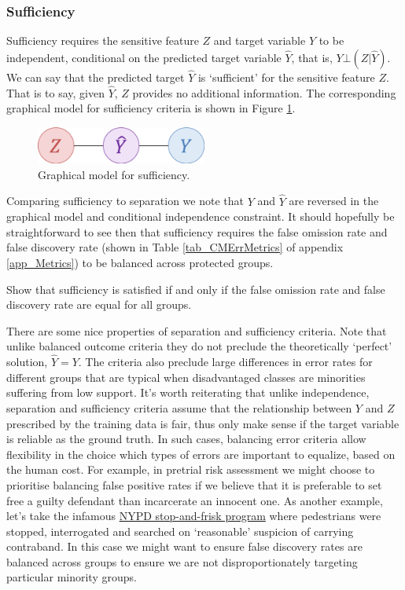 \subsubsection*{Sufficiency}

Sufficiency requires the sensitive feature $Z$ and target variable $Y$ to be independent, conditional on the predicted target variable $\hat{Y}$, that is, $Y \bot (Z|\hat{Y})$. We can say that the predicted target $\hat{Y}$ is `sufficient' for the sensitive feature $Z$. That is to say, given $\hat{Y}$, $Z$ provides no additional information. The corresponding graphical model for sufficiency criteria is shown in Figure \ref{fig_sufficiency}.
%
\begin{figure}[h!]
\centering
\includegraphics[width=0.5\textwidth]{03_GroupFairness/figures/Fig_sufficiency.png}
\caption{Graphical model for sufficiency.}
\label{fig_sufficiency}
\end{figure}
%
Comparing sufficiency to separation we note that $Y$ and $\hat{Y}$ are reversed in the graphical model and conditional independence constraint. It should hopefully be straightforward to see then that sufficiency requires the false omission rate and false discovery rate (shown in Table \ref{tab_CMErrMetrics} of appendix \ref{app_Metrics}) to be balanced across protected groups.

\begin{lookbox}
Show that sufficiency is satisfied if and only if the false omission rate and false discovery rate are equal for all groups.
\end{lookbox}

There are some nice properties of separation and sufficiency criteria. Note that unlike balanced outcome criteria they do not preclude the theoretically `perfect' solution, $\hat{Y}=Y$. The criteria also preclude large differences in error rates for different groups that are typical when disadvantaged classes are minorities suffering from low support. It's worth reiterating that unlike independence, separation and sufficiency criteria assume that the relationship between $Y$ and $Z$ prescribed by the training data is fair, thus only make sense if the target variable is reliable as the ground truth. In such cases, balancing error criteria allow flexibility in the choice which types of errors are important to equalize, based on the human cost. For example, in pretrial risk assessment we might choose to prioritise balancing false positive rates if we believe that it is preferable to set free a guilty defendant than incarcerate an innocent one. As another example, let's take the infamous \href{https://en.wikipedia.org/wiki/Stop-and-frisk_in_New_York_City}{NYPD stop-and-frisk program} where pedestrians were stopped, interrogated and searched on `reasonable' suspicion of carrying contraband. In this case we might want to ensure false discovery rates are balanced across groups to ensure we are not disproportionately targeting particular minority groups.

